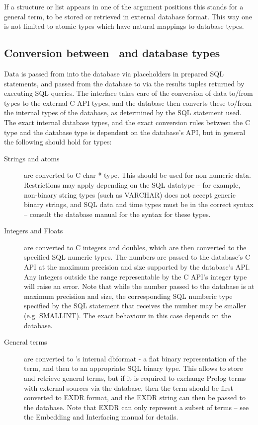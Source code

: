 If a structure or list appears in
one of the argument positions this stands for a general term, to
be stored or retrieved in external database format. This way one is not
limited to atomic types which have natural mappings to database types.

\subsection{Conversion between \eclipse\ and database types}

Data is passed from {\eclipse\/} into the database via placeholders in
prepared SQL statements, and passed from the database to {\eclipse\/} via
the results tuples returned by executing SQL queries. 
The interface takes care of the conversion of data to/from {\eclipse\/}
types to the external C API types, and the database then converts these to/from
the internal types of the database, as determined by the SQL statement used. 
The exact internal database types, and the exact conversion rules between
the C type and the database type is dependent on the database's API, but in
general the following should hold for {\eclipse\/} types:

\begin{description}
\item[Strings and atoms] are converted to C char * type. This should be used for 
  non-numeric data. Restrictions may apply depending on the SQL datatype --
  for example, non-binary string types (such as VARCHAR) does not accept
  generic binary strings, and SQL data and time types must be in the
  correct syntax -- consult the database manual for the syntax for these types.
\item[Integers and Floats] are converted to C integers and doubles, which are
  then converted to the specified SQL numeric types. The numbers are passed
  to the database's C API at the maximum precision and size supported by
  the database's API. Any integers outside the range representable by the
   C API's integer type will raise an error. Note that while the number
  passed to the database is at maximum precisiion and size, the
  corresponding SQL numberic type specified by the SQL statement that
  receives the number may be smaller
  (e.g. SMALLINT). The exact behaviour in this case
  depends on the database.
\item[General terms] are converted to {\eclipse}'s internal dbformat
 - a flat binary representation of the term, and then to an appropriate SQL
 binary type. This 
 allows {\eclipse\/} to store and retrieve general terms, but if it is
 required to exchange Prolog terms with external sources via the
 database, then the term should be first converted to EXDR format, and the
 EXDR string can then be passed to the database. Note that EXDR can only
 represent a subset of terms -- see the Embedding and Interfacing manual
 for details.

\end{description}


